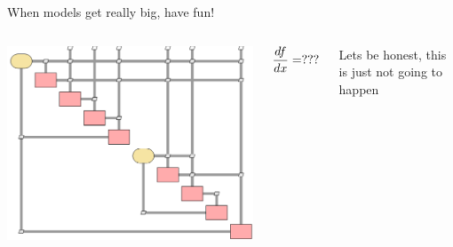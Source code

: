 \documentclass[aspectratio=169, usenames,dvipsnames, 14pt]{beamer}
\begin{document}


\begin{frame}{When models get really big, have fun!}
\begin{columns}
        \includegraphics[scale=0.5]{images/slide_81.png}
    
        \begin{center}
            
        
        \begin{equation*}
            \LARGE\frac{df}{dx} = ???
        \end{equation*}
        \end{center}
        Lets be honest, this is just not going to happen
    
\end{columns}
    
\end{frame}

\end{document}
